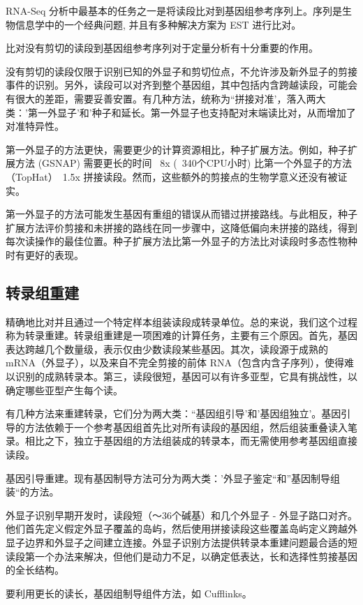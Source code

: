 RNA-Seq 分析中最基本的任务之一是将读段比对到基因组参考序列上。序列是生物信息学中的一个经典问题, 并且有多种解决方案为 EST 进行比对。

比对没有剪切的读段到基因组参考序列对于定量分析有十分重要的作用。

没有剪切的读段仅限于识别已知的外显子和剪切位点，不允许涉及新外显子的剪接事件的识别。另外，读段可以对齐到整个基因组，其中包括内含跨越读段，可能会有很大的差距，需要妥善安置。有几种方法，统称为“拼接对准'，落入两大类：'第一外显子'和'种子和延长。第一外显子也支持配对末端读比对，从而增加了对准特异性。

第一外显子的方法更快，需要更少的计算资源相比，种子扩展方法。例如，种子扩展方法 (GSNAP) 需要更长的时间 ~8x (~340个CPU小时) 比第一个外显子的方法（TopHat）~1.5x 拼接读段。然而，这些额外的剪接点的生物学意义还没有被证实。

第一外显子的方法可能发生基因有重组的错误从而错过拼接路线。与此相反，种子扩展方法评价剪接和未拼接的路线在同一步骤中，这降低偏向未拼接的路线，得到每次读操作的最佳位置。种子扩展方法比第一外显子的方法比对读段时多态性物种时有更好的表现。

\subsection{转录组重建}

精确地比对并且通过一个特定样本组装读段成转录单位。总的来说，我们这个过程称为转录重建。转录组重建是一项困难的计算任务，主要有三个原因。首先，基因表达跨越几个数量级，表示仅由少数读段某些基因。其次，读段源于成熟的 mRNA（外显子），以及来自不完全剪接的前体 RNA（包含内含子序列），使得难以识别的成熟转录本。第三，读段很短，基因可以有许多亚型，它具有挑战性，以确定哪些亚型产生每个读。

有几种方法来重建转录，它们分为两大类：“基因组引导'和'基因组独立'。基因引导的方法依赖于一个参考基因组首先比对所有读段的基因组，然后组装重叠读入笔录。相比之下，独立于基因组的方法组装成的转录本，而无需使用参考基因​​组直接读段。

基因引导重建。现有基因制导方法可分为两大类：'外显子鉴定“和”基因制导组装“的方法。

外显子识别早期开发时，读段短（〜36个碱基）和几个外显子 - 外显子路口对齐。他们首先定义假定外显子覆盖的岛屿，然后使用拼接读段这些覆盖岛屿定义跨越外显子边界和外显子之间建立连接。外显子识别方法提供转录本重建问题最合适的短读段第一个办法来解决，但他们是动力不足，以确定低表达，长和选择性剪接基因的全长结构。

要利用更长的读长，基因组制导组件方法，如 Cufflinks。

